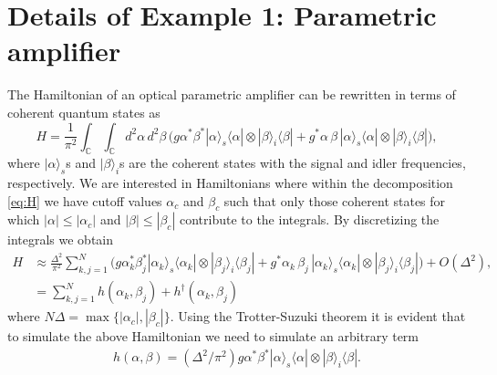 \documentclass[aps,pra,twocolumn,floatfix,groupedaddress,superscriptaddress,nofootinbib,notitlepage]{revtex4-2}
\begin{document}
\section{Details of Example 1: Parametric amplifier}
\label{app:NLC}

The Hamiltonian of an optical parametric amplifier can be rewritten in terms of coherent quantum states as \cite{IndCohwithoutIndEm}
\begin{equation}
H=\frac{1}{\pi^{2}} \textstyle{\int_{\mathds{C}}} \textstyle{\int_{\mathds{C}}} d^{2}\alpha \, d^{2}\beta\, \big(g\alpha^{*} \beta^{*} |\alpha\rangle_{s}\langle \alpha| \otimes |\beta\rangle_{i}\langle \beta|+ g^{*}\alpha\,\beta\,|\alpha\rangle_{s}\langle \alpha| \otimes |\beta\rangle_{i}\langle \beta| \big),
\label{eq:H}
\end{equation}
where $|\alpha\rangle_{s}$s and $|\beta\rangle_{i}$s are the coherent states with the signal and idler frequencies, respectively. We are interested in Hamiltonians where within the decomposition \eqref{eq:H} we have cutoff values $\alpha_{c}$ and $\beta_{c}$ such that only those coherent states for which $|\alpha|\leqslant |\alpha_{c}|$ and $|\beta|\leqslant |\beta_{c}|$ contribute to the integrals. By discretizing the integrals we obtain 
\begin{align}
H &\approx \frac{\Delta^{2}}{\pi^{2}}  \textstyle{\sum}_{k,j=1}^{N} \big(g\alpha_{k}^{*} \beta_{j}^{*} |\alpha_{k}\rangle_{s}\langle \alpha_{k}| \otimes |\beta_{j}\rangle_{i}\langle \beta_{j}|+ g^{*}\alpha_{k}\,\beta_{j}\,|\alpha_{k}\rangle_{s}\langle \alpha_{k}| \otimes |\beta_{j}\rangle_{i}\langle \beta_{j}| \big)+O(\Delta^{2}),\nonumber\\
\label{paramAmp}
&= \textstyle{\sum}_{k,j=1}^{N} h(\alpha_{k}, \beta_{j})+h^{\dag}(\alpha_{k}, \beta_{j})
\end{align}
where $N\Delta=\max\{|\alpha_{c}|,|\beta_{c}|\}$. Using the Trotter-Suzuki theorem it is evident that to simulate the above Hamiltonian we need to simulate an arbitrary term 
\begin{align}
h (\alpha,\beta) = (\Delta^{2}/\pi^{2})  g\alpha^{*} \beta^{*} |\alpha\rangle_{s}\langle \alpha| \otimes |\beta\rangle_{i}\langle \beta|.
\end{align} 
\end{document}
